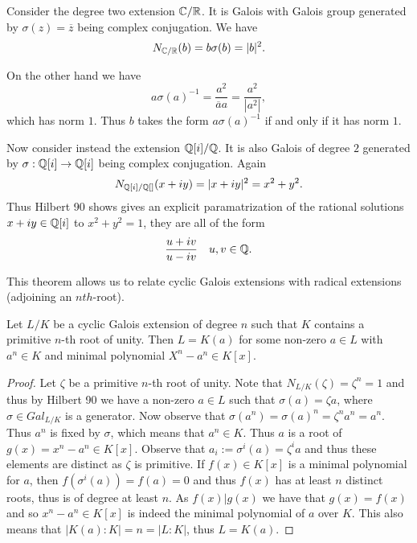 \documentclass[twoside, a4paper, 10pt]{amsart}
\begin{document}
\begin{eg} Consider the degree two extension $\mathbb{C}/\mathbb{R}$. It is Galois with Galois group generated by $\sigma(z) = \overline{z}$ being complex conjugation. We have $$N_{\mathbb{C}/\mathbb{R}}(b) = b \sigma(b) = |b|^2.$$

On the other hand we have $$a \sigma(a)^{-1} = \frac{a^2}{\overline{a}{a}} = \frac{a^2}{|a^2|},$$ which has norm $1$. Thus $b$ takes the form $a \sigma(a)^{-1}$ if and only if it has norm $1$.

Now consider instead the extension $\mathbb{Q}[i]/\mathbb{Q}$. It is also Galois of degree $2$ generated by $\sigma:\mathbb{Q}[i] \to \mathbb{Q}[i]$ being complex conjugation. Again $$N_{\mathbb{Q}[i]/\mathbb{Q}[]} (x+iy) = |x+iy|^2 = x^2 + y^2.$$ Thus Hilbert 90 shows gives an explicit paramatrization of the rational solutions $x+iy \in \mathbb{Q}[i]$ to $x^2 + y^2 = 1$, they are all of the form $$\frac{u+iv}{u-iv} \quad u, v \in \mathbb{Q}.$$\end{eg}

This theorem allows us to relate cyclic Galois extensions with radical extensions (adjoining an $nth$-root).

\begin{prop} Let $L/K$ be a cyclic Galois extension of degree $n$ such that $K$ contains a primitive $n$-th root of unity. Then $L = K(a)$ for some non-zero $a \in L$ with $a^n \in K$ and minimal polynomial $X^n - a^n \in K[x]$.

\end{prop}

\begin{proof} Let $\zeta$ be a primitive $n$-th root of unity. Note that $N_{L/K}(\zeta) = \zeta^n = 1$ and thus by Hilbert 90 we have a non-zero $a \in L$ such that $\sigma(a) = \zeta a$, where $\sigma \in Gal_{L/K}$ is a generator. Now observe that $\sigma(a^n) = \sigma(a)^n = \zeta^n a^n = a^n$. Thus $a^n$ is fixed by $\sigma$, which means that $a^n \in K$. Thus $a$ is a root of $g(x) = x^n - a^n \in K[x]$. Observe that $a_i := \sigma^i(a) = \zeta^i a$ and thus these elements are distinct as $\zeta$ is primitive. If $f(x) \in K[x]$ is a minimal polynomial for $a$, then $f(\sigma^i(a)) = f(a) = 0$ and thus $f(x)$ has at least $n$ distinct roots, thus is of degree at least $n$. As $f(x) | g(x)$ we have that $g(x) = f(x)$ and so $x^n - a^n \in K[x]$ is indeed the minimal polynomial of $a$ over $K$. This also means that $|K(a):K| = n = |L:K|$, thus $L = K(a)$. \end{proof}
\end{document}
